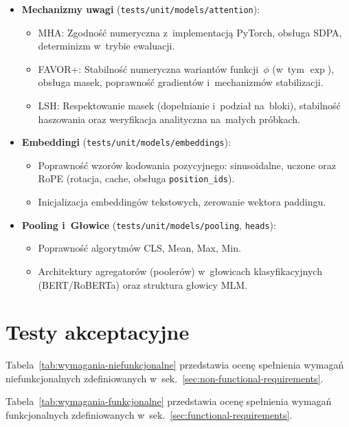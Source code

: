 \documentclass[a4paper,11pt,twoside]{report}
\theoremstyle{definition}
\begin{document}
\begin{itemize}
    \item \textbf{Mechanizmy uwagi} (\texttt{tests/unit/models/attention}):
    \begin{itemize}
        \item MHA: Zgodność numeryczna z~implementacją PyTorch, obsługa SDPA, determinizm w~trybie ewaluacji.
        \item FAVOR+: Stabilność numeryczna wariantów funkcji~$\phi$ (w~tym $\exp$), obsługa masek, poprawność gradientów i~mechanizmów stabilizacji.
        \item LSH: Respektowanie masek (dopełnianie i~podział na~bloki), stabilność haszowania oraz weryfikacja analityczna na~małych próbkach.
    \end{itemize}

    \item \textbf{Embeddingi} (\texttt{tests/unit/models/embeddings}):
    \begin{itemize}
        \item Poprawność wzorów kodowania pozycyjnego: sinusoidalne, uczone oraz RoPE (rotacja, cache, obsługa \texttt{position\_ids}).
        \item Inicjalizacja embeddingów tekstowych, zerowanie wektora paddingu.
    \end{itemize}

    \item \textbf{Pooling i~Głowice} (\texttt{tests/unit/models/pooling}, \texttt{heads}):
    \begin{itemize}
        \item Poprawność algorytmów CLS, Mean, Max, Min.
        \item Architektury agregatorów (poolerów) w~głowicach klasyfikacyjnych (BERT/RoBERTa) oraz struktura głowicy MLM.
    \end{itemize}
\end{itemize}



\section{Testy akceptacyjne}


Tabela~\ref{tab:wymagania-niefunkcjonalne} przedstawia ocenę spełnienia wymagań niefunkcjonalnych zdefiniowanych w~sek.~\ref{sec:non-functional-requirements}.

Tabela~\ref{tab:wymagania-funkcjonalne} przedstawia ocenę spełnienia wymagań funkcjonalnych zdefiniowanych w~sek.~\ref{sec:functional-requirements}.
\end{document}
